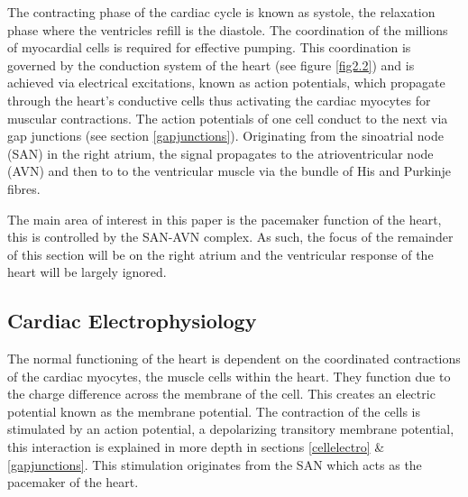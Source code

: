 The contracting phase of the cardiac cycle is known as systole, the relaxation phase where the ventricles refill is the diastole. The coordination of the millions of myocardial cells is required for effective pumping. This coordination is governed by the conduction system of the heart (see figure \ref{fig2.2}) and is achieved via electrical excitations, known as action potentials, which propagate through the heart's conductive cells thus activating the cardiac myocytes for muscular contractions. The action potentials of one cell conduct to the next via gap junctions (see section \ref{gapjunctions}). Originating from the sinoatrial node (SAN) in the right atrium, the signal propagates to the atrioventricular node (AVN) and then to to the ventricular muscle via the bundle of His and Purkinje fibres. \par

The main area of interest in this paper is the pacemaker function of the heart, this is controlled by the SAN-AVN complex. As such, the focus of the remainder of this section will be on the right atrium and the ventricular response of the heart will be largely ignored.

\subsection{Cardiac Electrophysiology}
The normal functioning of the heart is dependent on the coordinated contractions of the cardiac myocytes, the muscle cells within the heart. They function due to the charge difference across the membrane of the cell. This creates an electric potential known as the membrane potential. The contraction of the cells is stimulated by an action potential, a depolarizing transitory membrane potential, this interaction is explained in more depth in sections \ref{cellelectro} \& \ref{gapjunctions}. This stimulation originates from the SAN which acts as the pacemaker of the heart. \par

